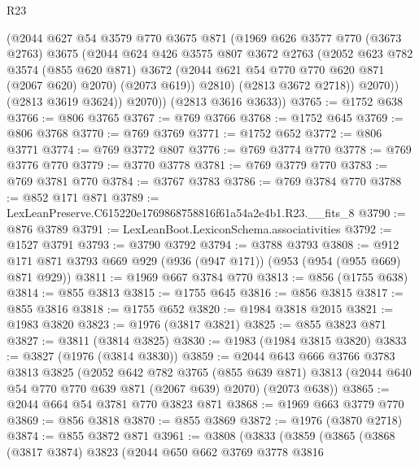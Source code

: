\begin{lexlean}{R23}
\begin{coremodule}
              (@2044
                @627
                @54
                @3579
                @770
                @3675
                @871
                (@1969
                  @626
                  @3577
                  @770
                  (@3673 @2763)
                  @3675
                  (@2044
                    @624
                    @426
                    @3575
                    @807
                    @3672
                    @2763
                    (@2052
                      @623
                      @782
                      @3574
                      (@855 @620 @871)
                      @3672
                      (@2044 @621 @54 @770 @770 @620 @871 (@2067 @620) @2070)
                      (@2073 @619))
                    @2810)
                  (@2813 @3672 @2718))
                @2070))
            (@2813 @3619 @3624))
          @2070))
      (@2813 @3616 @3633))
@3765 := @1752 @638
@3766 := @806 @3765
@3767 := @769 @3766
@3768 := @1752 @645
@3769 := @806 @3768
@3770 := @769 @3769
@3771 := @1752 @652
@3772 := @806 @3771
@3774 := @769 @3772 @807
@3776 := @769 @3774 @770
@3778 := @769 @3776 @770
@3779 := @3770 @3778
@3781 := @769 @3779 @770
@3783 := @769 @3781 @770
@3784 := @3767 @3783
@3786 := @769 @3784 @770
@3788 := @852 @171 @871
@3789 := LexLeanPreserve.C615220e1769868758816f61a54a2e4b1.R23.__fits_8
@3790 := @876 @3789
@3791 := LexLeanBoot.LexiconSchema.associativities
@3792 := @1527 @3791
@3793 := @3790 @3792
@3794 := @3788 @3793
@3808 := @912 @171 @871 @3793 @669 @929 (@936 (@947 @171)) (@953 (@954 (@955 @669) @871 @929))
@3811 := @1969 @667 @3784 @770
@3813 := @856 (@1755 @638)
@3814 := @855 @3813
@3815 := @1755 @645
@3816 := @856 @3815
@3817 := @855 @3816
@3818 := @1755 @652
@3820 := @1984 @3818 @2015
@3821 := @1983 @3820
@3823 := @1976 (@3817 @3821)
@3825 := @855 @3823 @871
@3827 := @3811 (@3814 @3825)
@3830 := @1983 (@1984 @3815 @3820)
@3833 := @3827 (@1976 (@3814 @3830))
@3859 := @2044
    @643
    @666
    @3766
    @3783
    @3813
    @3825
    (@2052
      @642
      @782
      @3765
      (@855 @639 @871)
      @3813
      (@2044 @640 @54 @770 @770 @639 @871 (@2067 @639) @2070)
      (@2073 @638))
@3865 := @2044 @664 @54 @3781 @770 @3823 @871
@3868 := @1969 @663 @3779 @770
@3869 := @856 @3818
@3870 := @855 @3869
@3872 := @1976 (@3870 @2718)
@3874 := @855 @3872 @871
@3961 := @3808
    (@3833
      (@3859
        (@3865
          (@3868
            (@3817 @3874)
            @3823
            (@2044
              @650
              @662
              @3769
              @3778
              @3816

\end{coremodule}
\end{lexlean}
